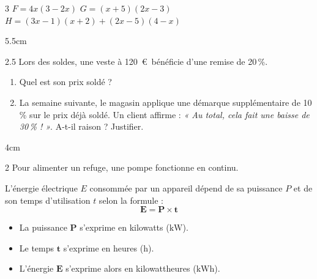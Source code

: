 \documentclass[a4paper]{book}
\begin{document}
{\begin{exerciceNote}{3}
        $F = 4x(3 - 2x)$ \quad $G = (x + 5)(2x - 3)$ \quad $H = (3x - 1)(x + 2) + (2x - 5)(4 - x)$
        
        \begin{ZoneReponse}{5.5cm}
        \end{ZoneReponse}
    \end{exerciceNote}
    
    \begin{exerciceNote}{2.5}
        Lors des soldes, une veste à 120~\euro~bénéficie d'une remise de 20\,\%. 
        \begin{enumerate}
            \item Quel est son prix soldé ?
            \item La semaine suivante, le magasin applique une démarque supplémentaire de 10\,\% sur le prix déjà soldé. Un client affirme : \textit{« Au total, cela fait une baisse de 30\,\% ! »}. A-t-il raison ? Justifier.
        \end{enumerate}
        \begin{ZoneReponse}{4cm}
        \end{ZoneReponse}
    \end{exerciceNote}


\newpage

    
    \begin{exerciceNote}{2}
        Pour alimenter un refuge, une pompe fonctionne en continu. 

        \begin{center}
        \begin{minipage}{0.8\textwidth}
            \begin{tcolorbox}[colback=gray!5,colframe=gray!40,arc=1mm,title=\small Rappel de cours,fonttitle=\bfseries\small,coltitle=black,colbacktitle=gray!20,size=small]
            L'énergie électrique $E$ consommée par un appareil dépend de sa puissance $P$ et de son temps d'utilisation $t$ selon la formule :
            $$\mathbf{E = P \times t}$$
            \begin{itemize}
                \item[$\bullet$] La puissance $\mathbf{P}$ s'exprime en kilowatts ($\text{kW}$).
                \item[$\bullet$] Le temps $\mathbf{t}$ s'exprime en heures ($\text{h}$).
                \item[$\bullet$] L'énergie $\mathbf{E}$ s'exprime alors en kilowattheures ($\text{kWh}$).
            \end{itemize}
            \end{tcolorbox}
        \end{minipage}
        \end{center}
        

\end{exerciceNote}}
\end{document}

